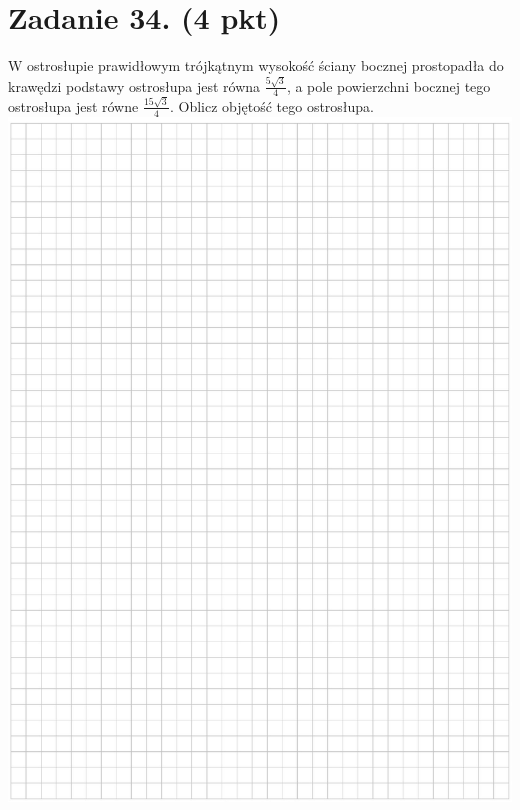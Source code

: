 \documentclass[10pt]{article}
\begin{document}
\section*{Zadanie 34. (4 pkt)}
W ostrosłupie prawidłowym trójkątnym wysokość ściany bocznej prostopadła do krawędzi podstawy ostrosłupa jest równa \(\frac{5 \sqrt{3}}{4}\), a pole powierzchni bocznej tego ostrosłupa jest równe \(\frac{15 \sqrt{3}}{4}\). Oblicz objętość tego ostrosłupa.\\
\includegraphics[max width=\textwidth, center]{2024_11_21_ad8c43efe74fa059d24eg-24}\\
\end{document}
